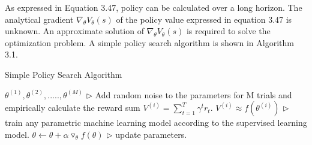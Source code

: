 \documentclass[12pt,twoside,a4]{mwbk}
\begin{document}
As expressed in Equation 3.47, policy can be calculated over a long horizon. The analytical gradient $\nabla_{\theta} V_{\theta}(s)$ of the policy value expressed in equation 3.47 is unknown. An approximate solution of $\nabla_{\theta} V_{\theta}(s)$ is required to solve the optimization problem. A simple policy search algorithm is shown in Algorithm 3.1.
\newpage
\begin{algorithm}
\caption{Simple Policy Search Algorithm}
\begin{algorithmic}[1]
\State $\theta^{(1)}, \theta^{(2)}, ....., \theta^{(M)}$ $\triangleright$ Add random noise to the parameters for M trials and empirically calculate the reward sum $V^{(i)} = \sum_{t=1}^{T} \gamma ^{t}r_{t}.$
\State $V^{(i)} \approx  f(\theta ^{(i)})$ $\triangleright$ train any parametric machine learning model according to the supervised learning model.
\State $\theta \leftarrow \theta + \alpha \triangledown _{\theta }f(\theta )$ $\triangleright$ update parameters.
\end{algorithmic}
\end{algorithm}
\end{document}
